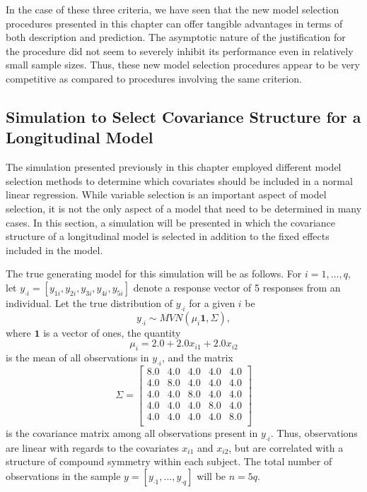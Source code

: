 		In the case of these three criteria, we have seen that the new model selection procedures presented in this chapter can offer tangible advantages in terms of both description
		and prediction. The asymptotic nature of the justification for the procedure did not seem to severely inhibit its performance even in relatively small sample sizes. Thus, these new model selection procedures appear to be very competitive as compared to
		procedures involving the same criterion.

		\subsection{Simulation to Select Covariance Structure for a Longitudinal Model}

		The simulation presented previously in this chapter employed different model selection methods to determine which covariates should be included in a normal linear regression.
		While variable selection is an important aspect of model selection, it is not the only aspect of a model that need to be determined in many cases. In this section, a simulation will be presented
		in which the covariance structure of a longitudinal model is selected in addition to the fixed effects included in the model.

		The true generating model for this simulation will be as follows. For $i = 1,...,q$, let $y_{\cdot i} = [y_{1 i},y_{2 i},y_{3 i},y_{4 i},y_{5 i}]$ denote a response vector of 5
		responses from an individual. Let the true distribution of $y_{\cdot i}$ for a given $i$ be
		\begin{equation}
			y_{\cdot i} \sim MVN( \mu_i \mathbf{1}, \Sigma) ,
		\end{equation}
		where $\mathbf{1}$ is a vector of ones, the quantity
		\begin{equation}
			\mu_i = 2.0 + 2.0 x_{i1} + 2.0 x_{i2}
		\end{equation}
		is the mean of all observations in $y_{\cdot i}$, and the matrix
		\begin{equation}
			\Sigma = 
			\begin{bmatrix}
				8.0 & 4.0 & 4.0 & 4.0 & 4.0 \\
				4.0 & 8.0 & 4.0 & 4.0 & 4.0 \\
				4.0 & 4.0 & 8.0 & 4.0 & 4.0 \\
				4.0 & 4.0 & 4.0 & 8.0 & 4.0 \\
				4.0 & 4.0 & 4.0 & 4.0 & 8.0 \\
			\end{bmatrix}
		\end{equation}
		is the covariance matrix among all observations present in $y_{\cdot i}$. Thus, observations are linear with regards to the covariates $x_{i1}$ and $x_{i2}$, but are correlated
		with a structure of compound symmetry within each subject. The total number of observations in the sample $y = [y_{\cdot 1},...,y_{\cdot q}]$ will be $n = 5q$.

